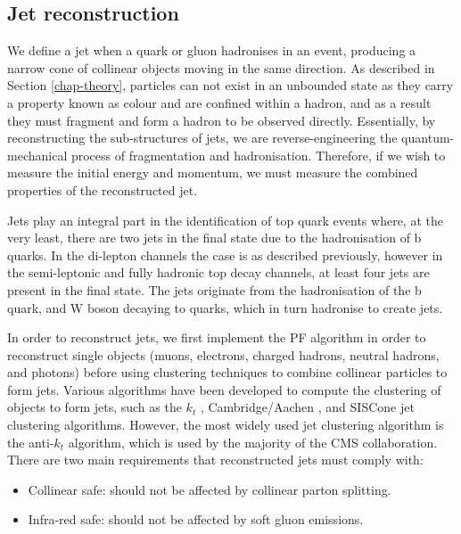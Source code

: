 \subsection{Jet reconstruction} \label{subsec-JetReconstruction}

We define a jet when a quark or gluon hadronises in an event, producing a narrow cone of collinear objects moving in the same direction. As described in Section \ref{chap-theory}, particles can not exist in an unbounded state as they carry a property known as colour and are confined within a hadron, and as a result they must fragment and form a hadron to be observed directly. Essentially, by reconstructing the sub-structures of jets, we are reverse-engineering the quantum-mechanical process of fragmentation and hadronisation. Therefore, if we wish to measure the initial energy and momentum, we must measure the combined properties of the reconstructed jet. 

Jets play an integral part in the identification of top quark events where, at the very least, there are two jets in the final state due to the hadronisation of b quarks. In the di-lepton channels the case is as described previously, however in the semi-leptonic and fully hadronic top decay channels, at least four jets are present in the final state. The jets originate from the hadronisation of the b quark, and W boson decaying to quarks, which in turn hadronise to create jets.  

In order to reconstruct jets, we first implement the PF algorithm in order to reconstruct single objects (muons, electrons, charged hadrons, neutral hadrons, and photons) before using clustering techniques to combine collinear particles to form jets. Various algorithms have been developed to compute the clustering of objects to form jets, such as the $k_t$ \cite{Ellis:1993tq}, Cambridge/Aachen \cite{Dokshitzer:1997in}, and SISCone \cite{Blazey:2000qt} jet clustering algorithms. However, the most widely used jet clustering algorithm is the anti-$k_t$ \cite{Cacciari:2008gp} algorithm, which is used by the majority of the CMS collaboration. There are two main requirements that reconstructed jets must comply with:

\begin{itemize}
	\item Collinear safe: should not be affected by collinear parton splitting.
	\item Infra-red safe: should not be affected by soft gluon emissions.
\end{itemize}

